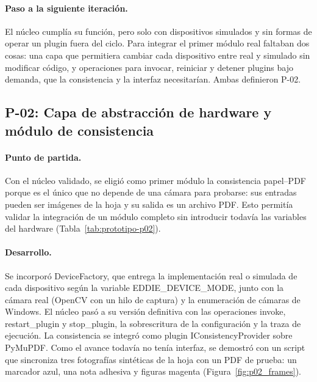 \paragraph{Paso a la siguiente iteración.} El núcleo cumplía su función, pero solo con dispositivos simulados y sin formas de operar un plugin fuera del ciclo. Para integrar el primer módulo real faltaban dos cosas: una capa que permitiera cambiar cada dispositivo entre real y simulado sin modificar código, y operaciones para invocar, reiniciar y detener plugins bajo demanda, que la consistencia y la interfaz necesitarían. Ambas definieron P-02.

\subsection{P-02: Capa de abstracción de hardware y módulo de consistencia}
\label{sec:it_p02}

\paragraph{Punto de partida.} Con el núcleo validado, se eligió como primer módulo la consistencia papel--PDF porque es el único que no depende de una cámara para probarse: sus entradas pueden ser imágenes de la hoja y su salida es un archivo PDF. Esto permitía validar la integración de un módulo completo sin introducir todavía las variables del hardware (Tabla~\ref{tab:prototipo-p02}).



\paragraph{Desarrollo.} Se incorporó DeviceFactory, que entrega la implementación real o simulada de cada dispositivo según la variable EDDIE\_DEVICE\_MODE, junto con la cámara real (OpenCV con un hilo de captura) y la enumeración de cámaras de Windows. El núcleo pasó a su versión definitiva con las operaciones invoke, restart\_plugin y stop\_plugin, la sobrescritura de la configuración y la traza de ejecución. La consistencia se integró como plugin IConsistencyProvider sobre PyMuPDF. Como el avance todavía no tenía interfaz, se demostró con un script que sincroniza tres fotografías sintéticas de la hoja con un PDF de prueba: un marcador azul, una nota adhesiva y figuras magenta (Figura~\ref{fig:p02_frames}).

